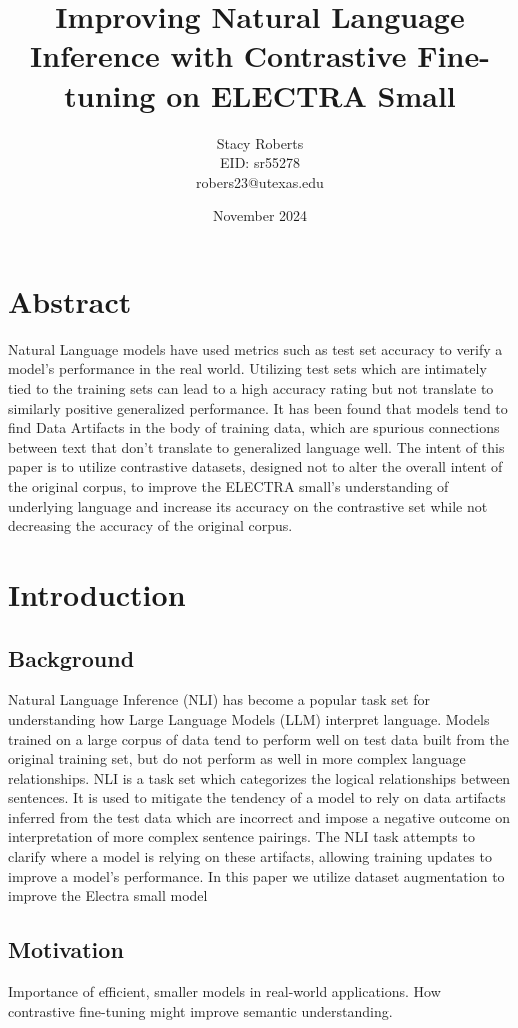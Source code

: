 \documentclass[11pt]{article}
\title{Improving Natural Language Inference with Contrastive Fine-tuning on ELECTRA Small}
\author{Stacy Roberts \\ EID: sr55278 \\robers23@utexas.edu}
\date{November 2024}
\begin{document}
\maketitle


\section*{Abstract}
Natural Language models have used metrics such as test set accuracy to verify a model's performance in the real world. Utilizing test sets which are intimately tied to the training sets can lead to a high accuracy rating but not translate to similarly positive generalized performance. It has been found that models tend to find Data Artifacts in the body of training data, which are spurious connections between text that don't translate to generalized language well. The intent of this paper is to utilize contrastive datasets, designed not to alter the overall intent of the original corpus, to improve the ELECTRA small's understanding of underlying language and increase its accuracy on the contrastive set while not decreasing the accuracy of the original corpus.

\section{Introduction}
\subsection{Background}
Natural Language Inference (NLI) has become a popular task set for understanding how Large Language Models (LLM) interpret language. Models trained on a large corpus of data tend to perform well on test data built from the original training set, but do not perform as well in more complex language relationships.  NLI is a task set which categorizes the logical relationships between sentences.  It is used to mitigate the tendency of a model to rely on data artifacts inferred from the test data which are incorrect and impose a negative outcome on interpretation of more complex sentence pairings. The NLI task attempts to clarify where a model is relying on these artifacts, allowing training updates to improve a model's performance. In this paper we utilize dataset augmentation to improve the Electra small model



\subsection{Motivation}
Importance of efficient, smaller models in real-world applications.
How contrastive fine-tuning might improve semantic understanding.
\end{document}
